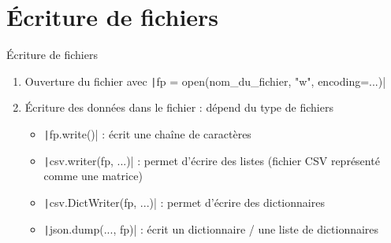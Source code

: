 \documentclass[10pt]{beamer}
\begin{document}
\section{Écriture de fichiers}
\begin{frame}[fragile]{Écriture de fichiers}
  \begin{enumerate}
    \item Ouverture du fichier avec \texttt|fp = open(nom_du_fichier, "w", encoding=...)|
    \item Écriture des données dans le fichier : dépend du type de fichiers
    \begin{itemize}
      \item \texttt|fp.write()| : écrit une chaîne de caractères
      \item \texttt|csv.writer(fp, ...)| : permet d'écrire des listes (fichier CSV représenté comme une matrice)
      \item \texttt|csv.DictWriter(fp, ...)| : permet d'écrire des dictionnaires
      \item \texttt|json.dump(..., fp)| : écrit un dictionnaire / une liste de dictionnaires
    \end{itemize}
  \end{enumerate}
\end{frame}
\end{document}
